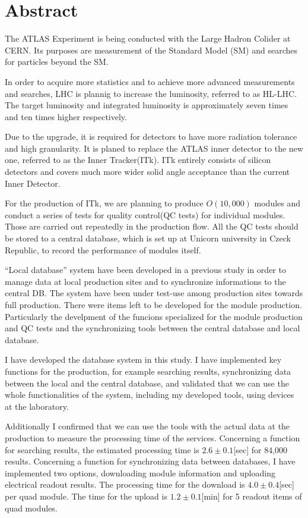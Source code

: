 \chapter*{Abstract}

The ATLAS Experiment is being conducted with the Large Hadron Colider at CERN. Its purposes are measurement of the Standard Model (SM) and searches for particles beyond the SM.

In order to acquire more statistics and to achieve more advanced measurements and searches, LHC is plannig to increase the luminosity, referred to as HL-LHC.
The target luminosity and integrated luminosity is approximately seven times and ten times higher respectively.

Due to the upgrade, it is required for detectors to have more radiation tolerance and high granularity. 
It is planed to replace the ATLAS inner detector to the new one, referred to as the Inner Tracker(ITk). 
ITk entirely consists of silicon detectors and covers much more wider solid angle acceptance than the current Inner Detector.

For the production of ITk, we are planning to produce $O(10,000)$ modules and conduct a series of tests for quality control(QC tests) for individual modules. 
Those are carried out repeatedly in the production flow.
All the QC tests should be stored to a central database, which is set up at Unicorn university in Czeck Republic, to record the performance of modules itself. 

``Local database'' system have been developed in a previous study in order to manage data at local production sites and to synchronize informations to the central DB. The system have been under test-use among production sites towards full production.
There were items left to be developed for the module production. Particularly the develpment of the funcions specialized for the module production and QC tests and the synchronizing tools between the central database and local database.

I have developed the database system in this study.
I have implemented key functions for the production, for example searching results, synchronizing data between the local and the central database, and validated that we can use the whole functionalities of the system, including my developed tools, using devices at the laboratory. 

Additionally I confirmed that we can use the tools with the actual data at the production to measure the processing time of the services.
Concerning a function for searching results, the estimated processing time is $2.6\pm 0.1$[sec] for 84,000 results.
Concerning a function for synchronizing data between databases, I have implemented two options, downloading module information and uploading electrical readout results.
The processing time for the download is $4.0\pm 0.4$[sec] per quad module.
The time for the upload is $1.2\pm 0.1$[min] for 5 readout items of quad modules.

